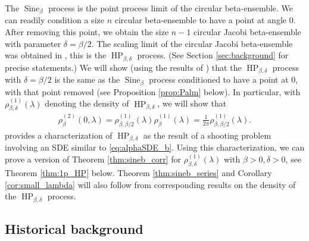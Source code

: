 \documentclass[12pt]{article}
\theoremstyle{definition} %
\theoremstyle{remark} %
\newcommand{\Sineb}{\operatorname{Sine}_{\beta}}
\newcommand{\HPb}{\operatorname{HP}_{\beta, \delta}}
\begin{document}
The $\Sineb$ process is the point process limit of the circular beta-ensemble. We can readily condition a size  $n$ circular beta-ensemble to have a point at angle 0. After removing this point, we obtain the size $n-1$ circular Jacobi beta-ensemble with parameter $\delta=\beta/2$. The scaling limit of the circular Jacobi beta-ensemble was obtained in \cite{LV_HP}, this is the $\HPb$ process. (See Section \ref{sec:background} for precise statements.) We will show (using the results of \cite{BVBV_Palm}) that the $\HPb$ process with $\delta=\beta/2$ is the same as the $\Sineb$ process conditioned to have a point at 0, with that point removed (see Proposition \ref{prop:Palm} below). In particular, with $\rho_{\beta,\delta}^{(1)}(\lambda)$ denoting the density of $\HPb$, we will show that  
\begin{align}\label{eq:palm}
  \rho_\beta^{(2)}(0,\lambda)=  \rho_{\beta,\beta/2}^{(1)}(\lambda){\rho_\beta^{(1)}(\lambda)}=\frac{1}{2\pi} \rho_{\beta,\beta/2}^{(1)}(\lambda).
\end{align}
\cite{LV_HP} provides a characterization of $\HPb$   as the result of a shooting problem involving an SDE similar to \eqref{eq:alphaSDE_b}. Using this characterization, we can prove a version of Theorem \ref{thm:sineb_corr} for $\rho_{\beta,\delta}^{(1)}(\lambda)$ with $\beta>0, \delta>0$, see Theorem \ref{thm:1p_HP} below. Theorem \ref{thm:sineb_series} and Corollary \ref{cor:small_lambda} will also follow from corresponding results on the density of the $\HPb$ process.


\subsection*{Historical background}
\end{document}
